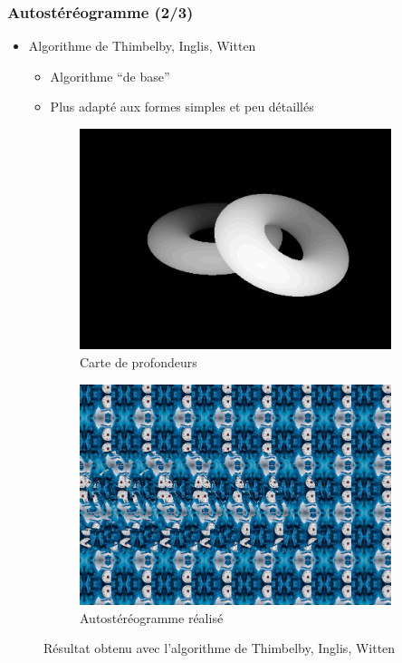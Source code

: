 \documentclass{beamer}
\begin{document}
\begin{frame}
\frametitle{Autostéréogramme (2/3)}
\begin{itemize}[label=$\bullet$]
\item Algorithme de Thimbelby, Inglis, Witten \cite{stereogram}
	\begin{itemize}[label=$\circ$]
	\item Algorithme ``de base''
	\item Plus adapté aux formes simples et peu détaillés
	\end{itemize}
\end{itemize}
\begin{figure}
\centering
\begin{subfigure}{.4\textwidth}
  \centering
  \includegraphics[width=1\linewidth]{donutdepth.png}
  \caption{Carte de profondeurs}
\end{subfigure}
\begin{subfigure}{.4\textwidth}
  \centering
  \includegraphics[width=1\linewidth]{donut1.png}
  \caption{Autostéréogramme réalisé}
\end{subfigure}
\caption{Résultat obtenu avec l'algorithme de Thimbelby, Inglis, Witten}
\end{figure}


\end{frame}
\end{document}
